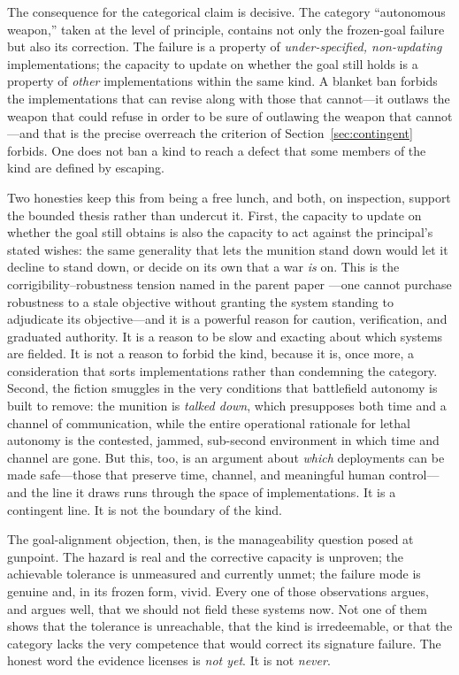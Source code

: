 \documentclass[11pt]{article}
\begin{document}
The consequence for the categorical claim is decisive. The category ``autonomous weapon,'' taken at the level of principle, contains not only the frozen-goal failure but also its correction. The failure is a property of \emph{under-specified, non-updating} implementations; the capacity to update on whether the goal still holds is a property of \emph{other} implementations within the same kind. A blanket ban forbids the implementations that can revise along with those that cannot---it outlaws the weapon that could refuse in order to be sure of outlawing the weapon that cannot---and that is the precise overreach the criterion of Section~\ref{sec:contingent} forbids. One does not ban a kind to reach a defect that some members of the kind are defined by escaping.

Two honesties keep this from being a free lunch, and both, on inspection, support the bounded thesis rather than undercut it. First, the capacity to update on whether the goal still obtains is also the capacity to act against the principal's stated wishes: the same generality that lets the munition stand down would let it decline to stand down, or decide on its own that a war \emph{is} on. This is the corrigibility--robustness tension named in the parent paper \citep{penumbra2026}---one cannot purchase robustness to a stale objective without granting the system standing to adjudicate its objective---and it is a powerful reason for caution, verification, and graduated authority. It is a reason to be slow and exacting about which systems are fielded. It is not a reason to forbid the kind, because it is, once more, a consideration that sorts implementations rather than condemning the category. Second, the fiction smuggles in the very conditions that battlefield autonomy is built to remove: the munition is \emph{talked down}, which presupposes both time and a channel of communication, while the entire operational rationale for lethal autonomy is the contested, jammed, sub-second environment in which time and channel are gone. But this, too, is an argument about \emph{which} deployments can be made safe---those that preserve time, channel, and meaningful human control---and the line it draws runs through the space of implementations. It is a contingent line. It is not the boundary of the kind.

The goal-alignment objection, then, is the manageability question posed at gunpoint. The hazard is real and the corrective capacity is unproven; the achievable tolerance is unmeasured and currently unmet; the failure mode is genuine and, in its frozen form, vivid. Every one of those observations argues, and argues well, that we should not field these systems now. Not one of them shows that the tolerance is unreachable, that the kind is irredeemable, or that the category lacks the very competence that would correct its signature failure. The honest word the evidence licenses is \emph{not yet}. It is not \emph{never}.
\end{document}
